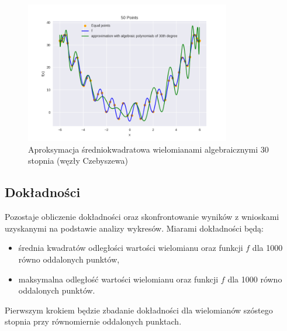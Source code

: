 \documentclass{article}
\begin{document}
\begin{figure}[H]
    \centering
    \includegraphics[width=0.8\textwidth]{img/algpoly_30_50.png}
    \caption{Aproksymacja średniokwadratowa wielomianami algebraicznymi 30 stopnia (węzły Czebyszewa)}
\end{figure}

\subsection{Dokładności}
Pozostaje obliczenie dokładności oraz skonfrontowanie wyników z wnioskami uzyskanymi na podstawie analizy wykresów. Miarami dokładności będą:
\begin{itemize}
    \item
    średnia kwadratów odległości wartości wielomianu oraz funkcji $f$ dla 1000 równo oddalonych punktów,
    \item
    maksymalna odległość wartości wielomianu oraz funkcji $f$ dla 1000 równo oddalonych punktów.
\end{itemize}

Pierwszym krokiem będzie zbadanie dokładności dla wielomianów szóstego stopnia przy równomiernie oddalonych punktach.
\end{document}

